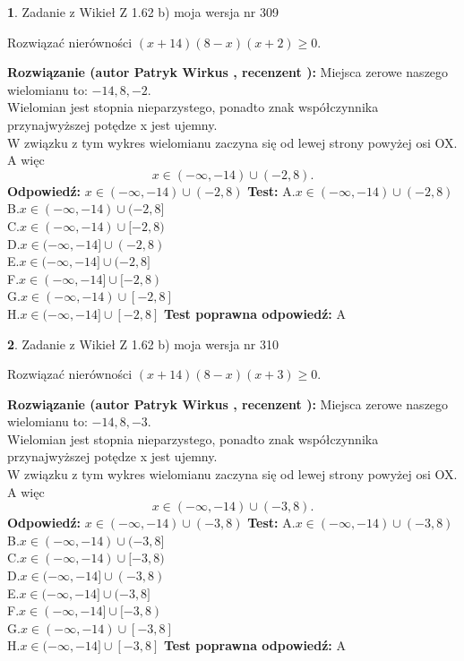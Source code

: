 \documentclass[12pt, a4paper]{article}
\theoremstyle{definition} %
\newtheorem{zad}{}
\newcommand{\zadStart}[1]{\begin{zad}#1\newline}
\newcommand{\zadStop}{\end{zad}}
\newcommand{\rozwStart}[2]{\noindent \textbf{Rozwiązanie (autor #1 , recenzent #2): }\newline}
\newcommand{\rozwStop}{\newline}
\newcommand{\odpStart}{\noindent \textbf{Odpowiedź:}\newline}
\newcommand{\odpStop}{\newline}
\newcommand{\testStart}{\noindent \textbf{Test:}\newline}
\newcommand{\testStop}{\newline}
\newcommand{\kluczStart}{\noindent \textbf{Test poprawna odpowiedź:}\newline}
\newcommand{\kluczStop}{\newline}
\begin{document}
\zadStart{Zadanie z Wikieł Z 1.62 b) moja wersja nr 309}

Rozwiązać nierówności $(x+14)(8-x)(x+2)\ge0$.
\zadStop
\rozwStart{Patryk Wirkus}{}
Miejsca zerowe naszego wielomianu to: $-14, 8, -2$.\\
Wielomian jest stopnia nieparzystego, ponadto znak współczynnika przy\linebreak najwyższej potędze x jest ujemny.\\ W związku z tym wykres wielomianu zaczyna się od lewej strony powyżej osi OX. A więc $$x \in (-\infty,-14) \cup (-2,8).$$
\rozwStop
\odpStart
$x \in (-\infty,-14) \cup (-2,8)$
\odpStop
\testStart
A.$x \in (-\infty,-14) \cup (-2,8)$\\
B.$x \in (-\infty,-14) \cup (-2,8]$\\
C.$x \in (-\infty,-14) \cup [-2,8)$\\
D.$x \in (-\infty,-14] \cup (-2,8)$\\
E.$x \in (-\infty,-14] \cup (-2,8]$\\
F.$x \in (-\infty,-14] \cup [-2,8)$\\
G.$x \in (-\infty,-14) \cup [-2,8]$\\
H.$x \in (-\infty,-14] \cup [-2,8]$
\testStop
\kluczStart
A
\kluczStop



\zadStart{Zadanie z Wikieł Z 1.62 b) moja wersja nr 310}

Rozwiązać nierówności $(x+14)(8-x)(x+3)\ge0$.
\zadStop
\rozwStart{Patryk Wirkus}{}
Miejsca zerowe naszego wielomianu to: $-14, 8, -3$.\\
Wielomian jest stopnia nieparzystego, ponadto znak współczynnika przy\linebreak najwyższej potędze x jest ujemny.\\ W związku z tym wykres wielomianu zaczyna się od lewej strony powyżej osi OX. A więc $$x \in (-\infty,-14) \cup (-3,8).$$
\rozwStop
\odpStart
$x \in (-\infty,-14) \cup (-3,8)$
\odpStop
\testStart
A.$x \in (-\infty,-14) \cup (-3,8)$\\
B.$x \in (-\infty,-14) \cup (-3,8]$\\
C.$x \in (-\infty,-14) \cup [-3,8)$\\
D.$x \in (-\infty,-14] \cup (-3,8)$\\
E.$x \in (-\infty,-14] \cup (-3,8]$\\
F.$x \in (-\infty,-14] \cup [-3,8)$\\
G.$x \in (-\infty,-14) \cup [-3,8]$\\
H.$x \in (-\infty,-14] \cup [-3,8]$
\testStop
\kluczStart
A
\kluczStop
\end{document}
